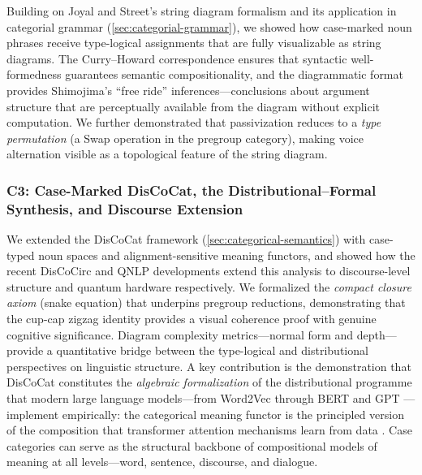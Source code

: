 \documentclass[
]{article}
\numberwithin{equation}{section}
\begin{document}
Building on Joyal and Street's \citeyearpar{joyalstreet1991geometry}
string diagram formalism and its application in categorial grammar
(\autoref{sec:categorial-grammar}), we showed how case-marked noun
phrases receive type-logical assignments that are fully visualizable as
string diagrams. The Curry--Howard correspondence ensures that syntactic
well-formedness guarantees semantic compositionality, and the
diagrammatic format provides Shimojima's
\citeyearpar{shimojima1996reasoning} ``free ride''
inferences---conclusions about argument structure that are perceptually
available from the diagram without explicit computation. We further
demonstrated that passivization reduces to a \emph{type permutation} (a
Swap operation in the pregroup category), making voice alternation
visible as a topological feature of the string diagram.

\subsubsection{C3: Case-Marked DisCoCat, the Distributional--Formal
Synthesis, and Discourse
Extension}\label{c3-case-marked-discocat-the-distributionalformal-synthesis-and-discourse-extension}

We extended the DisCoCat framework (\autoref{sec:categorical-semantics})
with case-typed noun spaces and alignment-sensitive meaning functors,
and showed how the recent DisCoCirc \citep{defelice2022discocirc} and
QNLP \citep{lorenz2023lambeq} developments extend this analysis to
discourse-level structure and quantum hardware respectively. We
formalized the \emph{compact closure axiom} (snake equation) that
underpins pregroup reductions, demonstrating that the cup-cap zigzag
identity provides a visual coherence proof with genuine cognitive
significance. Diagram complexity metrics---normal form and
depth---provide a quantitative bridge between the type-logical and
distributional perspectives on linguistic structure. A key contribution
is the demonstration that DisCoCat constitutes the \emph{algebraic
formalization} of the distributional programme that modern large
language models---from Word2Vec \citep{mikolov2013efficient} through
BERT \citep{devlin2019bert} and GPT
\citep{radford2018improving}---implement empirically: the categorical
meaning functor is the principled version of the composition that
transformer attention mechanisms learn from data
\citep{vaswani2017attention}. Case categories can serve as the
structural backbone of compositional models of meaning at all
levels---word, sentence, discourse, and dialogue.
\end{document}
